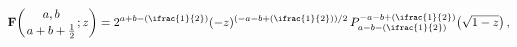 \[\mathop{\mathbf{F}\/}\nolimits\!\left({a,b\atop a+b+\tfrac{1}{2}};z\right)=2^{%
a+b-(\ifrac{1}{2})}(-z)^{(-a-b+(\ifrac{1}{2}))/2}\*\mathop{P^{-a-b+(\ifrac{1}{%
2})}_{a-b-(\ifrac{1}{2})}\/}\nolimits\!\left(\sqrt{1-z}\right),\]